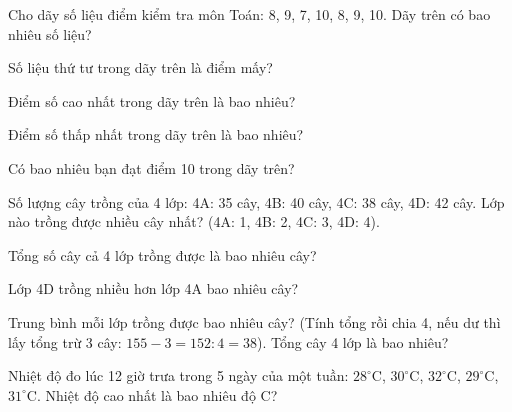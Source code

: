 \begin{ex}
Cho dãy số liệu điểm kiểm tra môn Toán: 8, 9, 7, 10, 8, 9, 10. Dãy trên có bao nhiêu số liệu?
\end{ex}

\begin{ex}
Số liệu thứ tư trong dãy trên là điểm mấy?
\end{ex}

\begin{ex}
Điểm số cao nhất trong dãy trên là bao nhiêu?
\end{ex}

\begin{ex}
Điểm số thấp nhất trong dãy trên là bao nhiêu?
\end{ex}

\begin{ex}
Có bao nhiêu bạn đạt điểm 10 trong dãy trên?
\end{ex}

\begin{ex}
Số lượng cây trồng của 4 lớp: 4A: 35 cây, 4B: 40 cây, 4C: 38 cây, 4D: 42 cây. Lớp nào trồng được nhiều cây nhất? (4A: 1, 4B: 2, 4C: 3, 4D: 4).
\end{ex}

\begin{ex}
Tổng số cây cả 4 lớp trồng được là bao nhiêu cây?
\end{ex}

\begin{ex}
Lớp 4D trồng nhiều hơn lớp 4A bao nhiêu cây?
\end{ex}

\begin{ex}
Trung bình mỗi lớp trồng được bao nhiêu cây? (Tính tổng rồi chia 4, nếu dư thì lấy tổng trừ 3 cây: $155 - 3 = 152 : 4 = 38$). Tổng cây 4 lớp là bao nhiêu?
\end{ex}

\begin{ex}
Nhiệt độ đo lúc 12 giờ trưa trong 5 ngày của một tuần: $28^\circ$C, $30^\circ$C, $32^\circ$C, $29^\circ$C, $31^\circ$C. Nhiệt độ cao nhất là bao nhiêu độ C?
\end{ex}

